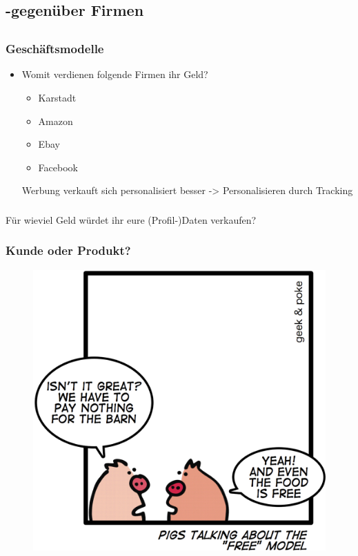\documentclass[12pt]{beamer}
\begin{document}
\begin{frame}
\section{-gegenüber Firmen}
\subsection{}

\begin{frame}
  \frametitle{Geschäftsmodelle}
  \begin{itemize}
    \item Womit verdienen folgende Firmen ihr Geld?
      \begin{itemize}
        \item<2-> Karstadt
        \item<3-> Amazon
        \item<4-> Ebay
        \item<5-> Facebook
      \end{itemize}
       Werbung verkauft sich personalisiert besser -> Personalisieren durch Tracking
  \end{itemize}
\end{frame}

\begin{frame}
  \frametitle{}
  \begin{center} \Large
   Für wieviel Geld würdet ihr eure (Profil-)Daten verkaufen?
  \end{center}
\end{frame}


\begin{frame}
  \frametitle{Kunde oder Produkt?}
  \begin{figure}
    \includegraphics[height=0.7\textheight]{img/business_pigs.jpg}
  \end{figure}
\end{frame}


\end{frame}
\end{document}
